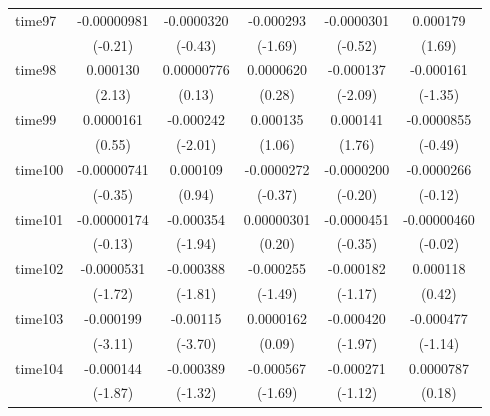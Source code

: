 \begin{table}[htbp]
\begin{tabular}{l*{5}{c}}
time97      & -0.00000981         &  -0.0000320         &   -0.000293         &  -0.0000301         &    0.000179         \\
            &     (-0.21)         &     (-0.43)         &     (-1.69)         &     (-0.52)         &      (1.69)         \\
time98      &    0.000130\sym{*}  &  0.00000776         &   0.0000620         &   -0.000137\sym{*}  &   -0.000161         \\
            &      (2.13)         &      (0.13)         &      (0.28)         &     (-2.09)         &     (-1.35)         \\
time99      &   0.0000161         &   -0.000242\sym{*}  &    0.000135         &    0.000141         &  -0.0000855         \\
            &      (0.55)         &     (-2.01)         &      (1.06)         &      (1.76)         &     (-0.49)         \\
time100     & -0.00000741         &    0.000109         &  -0.0000272         &  -0.0000200         &  -0.0000266         \\
            &     (-0.35)         &      (0.94)         &     (-0.37)         &     (-0.20)         &     (-0.12)         \\
time101     & -0.00000174         &   -0.000354         &  0.00000301         &  -0.0000451         & -0.00000460         \\
            &     (-0.13)         &     (-1.94)         &      (0.20)         &     (-0.35)         &     (-0.02)         \\
time102     &  -0.0000531         &   -0.000388         &   -0.000255         &   -0.000182         &    0.000118         \\
            &     (-1.72)         &     (-1.81)         &     (-1.49)         &     (-1.17)         &      (0.42)         \\
time103     &   -0.000199\sym{**} &    -0.00115\sym{***}&   0.0000162         &   -0.000420\sym{*}  &   -0.000477         \\
            &     (-3.11)         &     (-3.70)         &      (0.09)         &     (-1.97)         &     (-1.14)         \\
time104     &   -0.000144         &   -0.000389         &   -0.000567         &   -0.000271         &   0.0000787         \\
            &     (-1.87)         &     (-1.32)         &     (-1.69)         &     (-1.12)         &      (0.18)         \\

\end{tabular}
\end{table}
